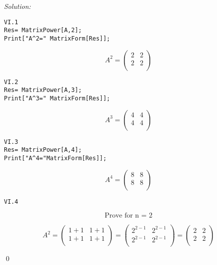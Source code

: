 \documentclass[12pt]{article}
\newenvironment{sol}
    {\emph{Solution:}
    }
    {
    \qed
    }
\begin{document}
\begin{sol}\\
\begin{lstlisting}
VI.1
Res= MatrixPower[A,2];
Print["A^2=" MatrixForm[Res]];
\end{lstlisting}
\begin{equation}
A^2= \left(
\begin{array}{cc}
 2 & 2 \\
 2 & 2 \\
\end{array}
\right)
\end{equation}

\begin{lstlisting}
VI.2
Res= MatrixPower[A,3];
Print["A^3=" MatrixForm[Res]];
\end{lstlisting}
\begin{equation}
A^3= \left(
\begin{array}{cc}
 4 & 4 \\
 4 & 4 \\
\end{array}
\right)
\end{equation}

\begin{lstlisting}
VI.3
Res= MatrixPower[A,4];
Print["A^4="MatrixForm[Res]];
\end{lstlisting}
\begin{equation}
A^4= \left(
\begin{array}{cc}
 8 & 8 \\
 8 & 8 \\
\end{array}
\right)
\end{equation}

\begin{lstlisting}
VI.4
\end{lstlisting}
\begin{equation}
\text{Prove for n = 2}
\end{equation}

\begin{equation}
A^2=\left(
\begin{array}{cc}
 1+1 & 1+1 \\
 1+1 & 1+1 \\
\end{array}
\right)=\left(
\begin{array}{cc}
 2^{2-1} & 2^{2-1} \\
 2^{2-1} & 2^{2-1} \\
\end{array}
\right)=\left(
\begin{array}{cc}
 2 & 2 \\
 2 & 2 \\
\end{array}
\right)
\end{equation}


\end{sol}
\end{document}
